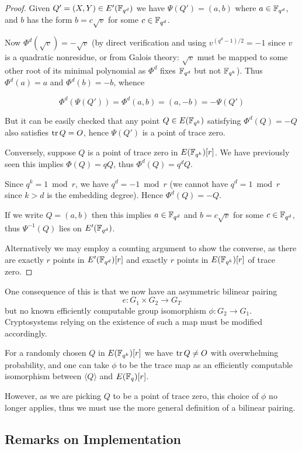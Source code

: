 \begin{proof}
Given $Q' = (X,Y) \in E'(\mathbb{F}_{q^d})$ we have $\Psi(Q') = (a, b)$
where $a \in \mathbb{F}_{q^d}$, and $b$ has the form $b = c \sqrt{v}$ for some
$c \in \mathbb{F}_{q^d}$.

Now $\Phi^d(\sqrt{v}) = -\sqrt{v}$ (by direct verification and using
$v^{(q^d - 1)/2} = -1$ since $v$ is a quadratic nonresidue, or
from Galois theory: $\sqrt{v}$ must
be mapped to some other root of its minimal polynomial as $\Phi^d$ fixes
$\mathbb{F}_{q^d}$ but not $\mathbb{F}_{q^k}$).
Thus $\Phi^d(a) = a$ and $\Phi^d(b) = -b$, whence

\[ \Phi^d(\Psi(Q')) = \Phi^d(a,b) = (a, -b) = -\Psi(Q') \]

But it can be easily checked that
any point $Q \in E(\mathbb{F}_{q^k})$ satisfying $\Phi^d(Q) = -Q$ also satisfies
$\mathop{\rm tr} Q = O$, hence $\Psi(Q')$ is a point of trace zero.

Conversely, suppose $Q$ is a point of trace zero in $E(\mathbb{F}_{q^k})[r]$.
We have previously seen this implies $\Phi(Q) = q Q$,
thus $\Phi^d(Q) = q^d Q$.

Since $q^k = 1 \bmod r$, we have $q^d = -1 \bmod r$ (we cannot
have $q^d = 1 \bmod r$ since $k > d$ is the embedding degree).
Hence $\Phi^d(Q) = -Q$.

If we write $Q=(a,b)$ then this implies $a \in \mathbb{F}_{q^d}$ and $b = c \sqrt{v}$
for some $c \in \mathbb{F}_{q^d}$, thus $\Psi^{-1}(Q)$ lies on $E'(\mathbb{F}_{q^d})$.

Alternatively we may employ a counting argument to show the converse,
as there are exactly
$r$ points in $E'(\mathbb{F}_{q^d})[r]$ and exactly $r$ points in $E(\mathbb{F}_{q^k})[r]$ of trace
zero.
\end{proof}

One consequence of this is that we
now have an asymmetric bilinear pairing
\[
e:G_1 \times G_2 \rightarrow G_T
\]
but no known efficiently computable group isomorphism
$\phi : G_2 \rightarrow G_1$. Cryptosystems relying on the existence of
such a map must be modified accordingly.

For a randomly chosen $Q$ in $E(\mathbb{F}_{q^k})[r]$ we have $\mathop{\rm tr} Q \ne O$ with
overwhelming probability, and one can take $\phi$ to be the trace map
as an efficiently computable isomorphism between $\langle Q \rangle$
and $E(\mathbb{F}_q)[r]$.

However, as we are picking $Q$ to be a point of trace zero, this choice
of $\phi$ no longer applies, thus we must use the more general definition
of a bilinear pairing.

\subsection {\label{sec:twistcurveremarks}Remarks on Implementation}

